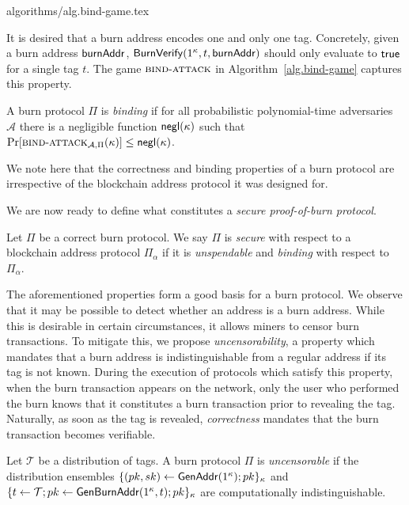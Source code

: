 {algorithms/alg.bind-game.tex}

It is desired that a burn address encodes one and only one tag. Concretely, given a burn address $\mathsf{burnAddr}$, $\mathsf{BurnVerify}(1^\kappa, t, \mathsf{burnAddr})$ should only evaluate to $\mathsf{true}$ for a single tag $t$. The game $\textsc{bind}\-\text{-}\-\textsc{attack}$ in Algorithm~\ref{alg.bind-game} captures this property.

\begin{definition}[Binding]
  A burn protocol $\Pi$ is \emph{binding} if
  for all probabilistic polynomial-time adversaries $\mathcal{A}$ there is a
  negligible function $\textsf{negl}(\kappa)$ such that
  $\Pr[\textsc{bind}\-\text{-}\-\textsc{attack}_{\mathcal{A},\Pi}(\kappa)] \leq \textsf{negl}(\kappa)$.
\end{definition}

We note here that the correctness and binding properties of a burn protocol are irrespective of the blockchain address protocol it was designed for.

We are now ready to define what constitutes a \emph{secure proof-of-burn protocol}.

\begin{definition}[Security]
  Let $\Pi$ be a correct burn protocol. We say $\Pi$ is \emph{secure} with respect to a blockchain address protocol $\Pi_\alpha$ if it is \emph{unspendable} and \emph{binding} with respect to $\Pi_\alpha$.
\end{definition}

The aforementioned properties form a good basis for a burn protocol. We observe that it may be possible to detect whether an address is a burn address. While this is desirable in certain circumstances, it allows miners to censor burn transactions. To mitigate this, we propose \emph{uncensorability}, a property which mandates that a burn address is indistinguishable from a regular address if its tag is not known. During the execution of protocols which satisfy this property, when the burn transaction appears on the network, only the user who performed the burn knows that it constitutes a burn transaction prior to revealing the tag. Naturally, as soon as the tag is revealed, \emph{correctness} mandates that the burn transaction becomes verifiable.

\begin{definition}[Uncensorability]
  Let $\mathcal{T}$ be a distribution of tags.
  A burn protocol $\Pi$ is \emph{uncensorable} if
  the distribution ensembles $\{(pk, sk) \gets \mathsf{GenAddr}(1^\kappa); pk\}_\kappa$ and
  $\{t \gets \mathcal{T}; pk \gets \mathsf{Gen}\-\mathsf{Burn}\-\mathsf{Addr}(1^\kappa, t); pk\}_\kappa$ are computationally indistinguishable.
\end{definition}
